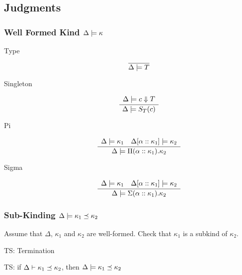 \documentclass[12pt,twoside,fleqn]{amsart}
\theoremstyle{plain}
\theoremstyle{plain}
\theoremstyle{definition}
\begin{document}
\newcommand{\tcheck}[3]{#1 \models #2 \Downarrow #3 }
 


\subsection{Judgments}


\subsubsection{Well Formed Kind \protect\( \Delta  \models \kappa \protect \)}

\begin{description}
\item [Type]
\[
\overline{\Delta  \models T }\]

\item [Singleton]
\[
\frac{\begin{array}{ll}
\Delta  \models c \Downarrow T
\end{array} }{\Delta  \models S_{T}(c ) }\]

\item [Pi]
\[
\frac{\begin{array}{ll}
\Delta  \models \kappa _{1} & \Delta  [\alpha   ::\kappa _{1}  ] \models \kappa _{2}
\end{array} }{\Delta  \models \Pi (\alpha ::\kappa _{1}).\kappa _{2} }\]

\item [Sigma]
\[
\frac{\begin{array}{ll}
\Delta  \models \kappa _{1} & \Delta  [\alpha   ::\kappa _{1}  ] \models \kappa _{2}
\end{array} }{\Delta  \models \Sigma (\alpha ::\kappa _{1}).\kappa _{2} }\]

\end{description}

\subsubsection{Sub-Kinding \protect\( \Delta  \models \kappa _{1} \preceq \kappa _{2}\protect \)}

Assume that \( \Delta  \), \( \kappa _{1} \) and \( \kappa _{2} \) are well-formed.
Check that \( \kappa _{1} \) is a subkind of \( \kappa _{2} \).

TS: Termination

TS: if \( \Delta  \vdash \kappa _{1}   \preceq \kappa _{2}   \), then \( \Delta  \models \kappa _{1}  \preceq \kappa _{2}  \)
\end{document}
